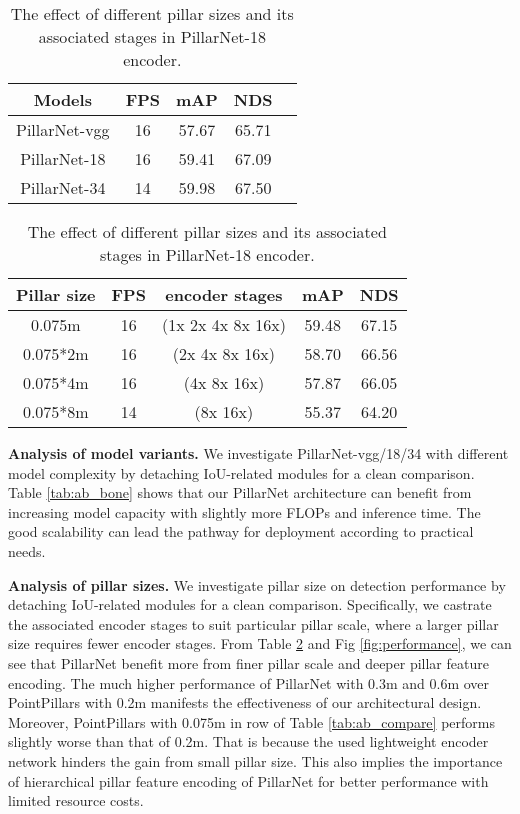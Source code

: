 \documentclass[runningheads]{llncs}
\begin{document}
\setlength{\tabcolsep}{1.4pt}
\begin{table}[t]
\parbox{0.38\linewidth}{
\centering
\caption{The effect of different PillarNet variants by detaching two IoU-related modules.}
\label{tab:ab_bone}
\begin{tabular}{c|c|c|cc}
\hline
Models & FPS & mAP & NDS \\ \hline
PillarNet-vgg & 16 & 57.67 & 65.71 \\
PillarNet-18 & 16 & 59.41 & 67.09 \\
PillarNet-34 & 14 & 59.98 & 67.50 \\
\hline
\end{tabular}
}
\hfill
\parbox{0.6\linewidth}{
\centering
\caption{The effect of different pillar sizes and its associated stages in PillarNet-18 encoder.}
\label{tab:ab_pillar}
\begin{tabular}{c|c|c|cc}
\hline
Pillar size & FPS & encoder stages & mAP & NDS  \\ \hline
0.075m & 16 & (1x 2x 4x 8x 16x) & 59.48 & 67.15 \\
0.075*2m & 16 & (2x 4x 8x 16x) & 58.70 & 66.56 \\
0.075*4m & 16 &(4x 8x 16x) & 57.87 & 66.05 \\
0.075*8m & 14 & (8x 16x) & 55.37 & 64.20 \\
\hline
\end{tabular}
}
\end{table}


{\flushleft \bf Analysis of model variants.}
We investigate PillarNet-vgg/18/34 with different model complexity by detaching IoU-related modules for a clean comparison.
Table \ref{tab:ab_bone} shows that our PillarNet architecture can benefit from increasing model capacity with slightly more FLOPs and inference time. 
The good scalability can lead the pathway for deployment according to practical needs.

{\flushleft \bf Analysis of pillar sizes.}
We investigate pillar size on detection performance by detaching IoU-related modules for a clean comparison.
Specifically, we castrate the associated encoder stages to suit particular pillar scale, where a larger pillar size requires fewer encoder stages.
From Table \ref{tab:ab_pillar} and Fig \ref{fig:performance}, we can see that PillarNet 
 benefit more from finer pillar scale and deeper pillar feature encoding.
The much higher performance of PillarNet with 0.3m and 0.6m over PointPillars with 0.2m manifests the effectiveness of our architectural design. 
Moreover, PointPillars \cite{lang2019pointpillars} with 0.075m in  row of Table \ref{tab:ab_compare} performs slightly worse than that of 0.2m. That is because the used lightweight encoder network hinders the gain from small pillar size. This also implies the importance of hierarchical pillar feature encoding of PillarNet for better performance with limited resource costs.
\end{document}
